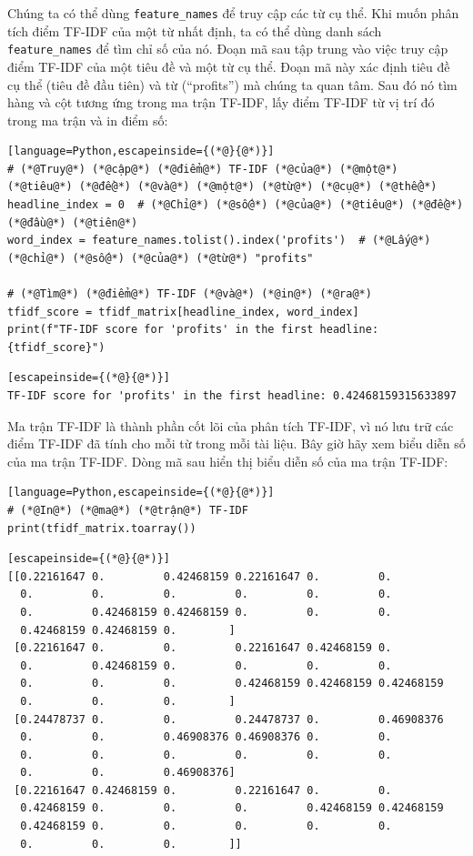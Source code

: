 Chúng ta có thể dùng \texttt{feature\_names} để truy cập các từ cụ thể. Khi muốn phân tích điểm TF-IDF của một từ nhất định, ta có thể dùng danh sách \texttt{feature\_names} để tìm chỉ số của nó. Đoạn mã sau tập trung vào việc truy cập điểm TF-IDF của một tiêu đề và một từ cụ thể. Đoạn mã này xác định tiêu đề cụ thể (tiêu đề đầu tiên) và từ (``profits'') mà chúng ta quan tâm. Sau đó nó tìm hàng và cột tương ứng trong ma trận TF-IDF, lấy điểm TF-IDF từ vị trí đó trong ma trận và in điểm số:

\begin{lstlisting}[language=Python,escapeinside={(*@}{@*)}]
# (*@Truy@*) (*@cập@*) (*@điểm@*) TF-IDF (*@của@*) (*@một@*) (*@tiêu@*) (*@đề@*) (*@và@*) (*@một@*) (*@từ@*) (*@cụ@*) (*@thể@*)
headline_index = 0  # (*@Chỉ@*) (*@số@*) (*@của@*) (*@tiêu@*) (*@đề@*) (*@đầu@*) (*@tiên@*)
word_index = feature_names.tolist().index('profits')  # (*@Lấy@*) (*@chỉ@*) (*@số@*) (*@của@*) (*@từ@*) "profits"

# (*@Tìm@*) (*@điểm@*) TF-IDF (*@và@*) (*@in@*) (*@ra@*)
tfidf_score = tfidf_matrix[headline_index, word_index]
print(f"TF-IDF score for 'profits' in the first headline: {tfidf_score}")
\end{lstlisting}

\begin{lstlisting}[escapeinside={(*@}{@*)}]
TF-IDF score for 'profits' in the first headline: 0.42468159315633897
\end{lstlisting}

Ma trận TF-IDF là thành phần cốt lõi của phân tích TF-IDF, vì nó lưu trữ các điểm TF-IDF đã tính cho mỗi từ trong mỗi tài liệu. Bây giờ hãy xem biểu diễn số của ma trận TF-IDF. Dòng mã sau hiển thị biểu diễn số của ma trận TF-IDF:

\begin{lstlisting}[language=Python,escapeinside={(*@}{@*)}]
# (*@In@*) (*@ma@*) (*@trận@*) TF-IDF
print(tfidf_matrix.toarray())
\end{lstlisting}

\begin{lstlisting}[escapeinside={(*@}{@*)}]
[[0.22161647 0.         0.42468159 0.22161647 0.         0.
  0.         0.         0.         0.         0.         0.
  0.         0.42468159 0.42468159 0.         0.         0.
  0.42468159 0.42468159 0.        ]
 [0.22161647 0.         0.         0.22161647 0.42468159 0.
  0.         0.42468159 0.         0.         0.         0.
  0.         0.         0.         0.42468159 0.42468159 0.42468159
  0.         0.         0.        ]
 [0.24478737 0.         0.         0.24478737 0.         0.46908376
  0.         0.         0.46908376 0.46908376 0.         0.
  0.         0.         0.         0.         0.         0.
  0.         0.         0.46908376]
 [0.22161647 0.42468159 0.         0.22161647 0.         0.
  0.42468159 0.         0.         0.         0.42468159 0.42468159
  0.42468159 0.         0.         0.         0.         0.
  0.         0.         0.        ]]
\end{lstlisting}


